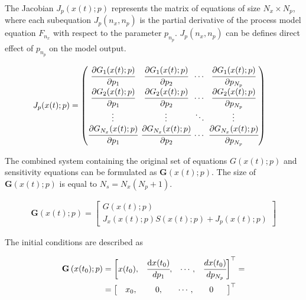 \documentclass[../Article_Sensitivity_Analsysis.tex]{subfiles}
\begin{document}
	The Jacobian ${J_p}(x(t);p)$ represents the matrix of equations of size $N_x \times N_p$, where each subequation ${J_p}(n_x,n_p)$ is the partial derivative of the process model equation $F_{n_x}$ with respect to the parameter $p_{n_p}$. ${J_p}(n_x,n_p)$ can be defines direct effect of $p_{n_p}$ on the model output.
	
	{\footnotesize
		\begin{align}
			{J_p}(x(t);p) & =
			\begingroup %
			\setlength\arraycolsep{2pt}
			\begin{pmatrix}
				\cfrac{\partial {G_{1}}(x(t);p)}{\partial {p_{1}}} & \cfrac{\partial {G_{1}}(x(t);p)}{\partial {p_{2}}} & \cdots & \cfrac{\partial {G_{1}}(x(t);p)}{\partial {p_{N_p}}}\\
				\cfrac{\partial {G_{2}}(x(t);p)}{\partial {p_{1}}} & \cfrac{\partial {G_{2}}(x(t);p)}{\partial {p_{2}}} & \cdots & \cfrac{\partial {G_{2}}(x(t);p)}{\partial {p_{N_p}}}\\
				\vdots & \vdots & \ddots & \vdots\\
				\cfrac{\partial {G_{N_x}}(x(t);p)}{\partial {p_{1}}} & \cfrac{\partial {G_{N_x}}(x(t);p)}{\partial {p_{2}}} & \cdots & \cfrac{\partial {G_{N_x}}(x(t);p)}{\partial {p_{N_p}}}
			\end{pmatrix}
			\endgroup
	\end{align}}
	
	The combined system containing the original set of equations ${G}(x(t);p)$ and sensitivity equations can be formulated as ${\textbf{G}}\left(x(t);p\right)$. The size of ${\textbf{G}}\left(x(t);p\right)$ is equal to $N_s = N_x(N_p + 1)$.
	
	{\footnotesize
		\begin{align}
			{\textbf{G}}\left(x(t);p\right) = 
			\begin{bmatrix}
				{G}(x(t);p)\\
				{J_x}(x(t);p)S(x(t);p) + {J_p}(x(t);p)
			\end{bmatrix}
	\end{align} }
	
	The initial conditions are described as
	
	{\footnotesize
		\begin{align}
			{\textbf{G}}\left(x(t_0);p\right)  &= 
			\begin{bmatrix}
                x(t_0),						               &
				\cfrac{ \text{d}x(t_0) }{ d{p_1} },		   &
				\cdots,					 				   &
				\cfrac{ dx(t_0) }{ d{p_{N_p}} }            
			\end{bmatrix}^\top = \\ &=
            \begin{bmatrix} 
                \quad x_0,	                               &
				\quad ~0,		                           &
			    \quad \cdots,			                   &
				\quad 0 \quad~~
			\end{bmatrix}^\top
	\end{align} }
	
\end{document}
